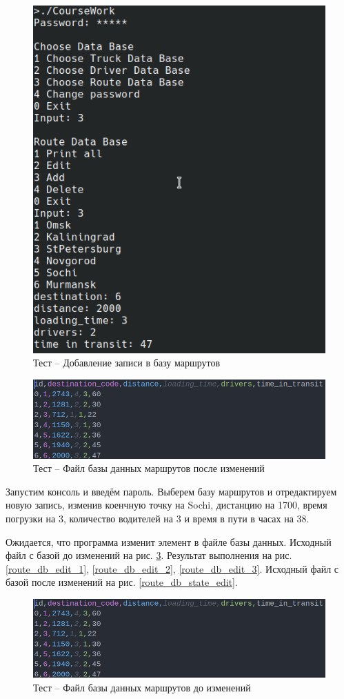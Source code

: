 \begin{figure}[H]
	\centering
	\includegraphics[width=0.4\linewidth]{photo/tests/admin/route_db_add}
	\caption{Тест -- Добавление записи в базу маршрутов}
	\label{route_db_add}
\end{figure}

\begin{figure}[H]
	\centering
	\includegraphics[width=0.5\linewidth]{photo/tests/admin/route_db_state_add}
	\caption{Тест -- Файл базы данных маршрутов после изменений}
	\label{route_db_state_add}
\end{figure}

Запустим консоль и введём пароль. 
Выберем базу маршрутов и отредактируем новую запись,
изменив 
коенчную точку на Sochi,
дистанцию на 1700,
время погрузки на 3,
количество водителей на 3 и 
время в пути в часах на 38.

Ожидается, что программа изменит элемент в файле базы данных.
Исходный файл с базой до изменений на рис. \ref{route_db_state_add2}.
Результат выполнения на рис. 
\ref{route_db_edit_1}, 
\ref{route_db_edit_2}, 
\ref{route_db_edit_3}.
Исходный файл с базой после изменений на рис. \ref{route_db_state_edit}.

\begin{figure}[H]
	\centering
	\includegraphics[width=0.7\linewidth]{photo/tests/admin/route_db_state_add}
	\caption{Тест -- Файл базы данных маршрутов до изменений}
	\label{route_db_state_add2}
\end{figure}

